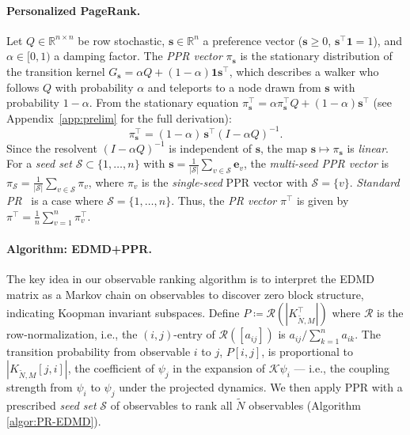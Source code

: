 \documentclass{article}
\theoremstyle{plain}
\theoremstyle{definition}
\def\R{\mathbb{R}}
\def\tp{\intercal}
\def\Koop{\mathcal{K}}
\newcommand{\arXivtag}[1][]{#1}
\begin{document}
	\paragraph{Personalized PageRank.}
	Let $Q \in \R^{n \times n}$ be row stochastic, $\mathbf{s} \in \R^n$ a preference vector ($\mathbf{s} \geq 0$, $\mathbf{s}^\tp\mathbf{1}=1$), and $\alpha \in [0,1)$ a damping factor. The \emph{PPR vector} ${\pi}_{\mathbf{s}}$ is the stationary distribution of the transition kernel $G_{\mathbf{s}} = \alpha Q + (1-\alpha)\mathbf{1}\mathbf{s}^\tp$, which describes a walker who follows $Q$ with probability $\alpha$ and teleports to a node drawn from $\mathbf{s}$ with probability $1-\alpha$. From the stationary equation ${\pi}_{\mathbf{s}}^\tp = \alpha{\pi}_{\mathbf{s}}^\tp Q + (1-\alpha)\mathbf{s}^\tp$ (see Appendix~\ref{app:prelim} for the full derivation):
	\begin{equation}\label{eq:ppr-resolvent}
		{\pi}_{\mathbf{s}}^\tp = (1-\alpha)\,\mathbf{s}^\tp(I - \alpha Q)^{-1}.
	\end{equation}
	Since the resolvent $(I - \alpha Q)^{-1}$ is independent of $\mathbf{s}$, the map $\mathbf{s} \mapsto {\pi}_{\mathbf{s}}$ is \emph{linear}. For a \emph{seed set} $\mathcal{S} \subset \{1,\ldots,n\}$ with $\mathbf{s} = \frac{1}{|\mathcal{S}|}\sum_{v \in \mathcal{S}}\mathbf{e}_v$, the \emph{multi-seed PPR vector} is $	{\pi}_{\mathcal{S}} = \frac{1}{|\mathcal{S}|}\sum_{v \in \mathcal{S}} {\pi}_v$, 
	where ${\pi}_v$ is the \emph{single-seed} PPR vector with $\mathcal{S} = \{v\}$. \emph{Standard PR}~\cite{PageRank1998, langville2004deeper} is a case where $\mathcal{S} = \{1,\ldots,n\}$. Thus, the \emph{PR vector} ${\pi}^\tp$ is given by ${\pi}^\tp = \frac{1}{n}\sum_{v=1}^n {\pi}_v^\tp$. 
	
	
	\paragraph{Algorithm: EDMD+PPR.}
	
	The key idea in our observable ranking algorithm is to interpret the EDMD matrix as a Markov chain on observables to discover zero block structure, indicating Koopman invariant subspaces. Define $P\coloneqq \mathcal{R}(|K_{\tilde{N},M}^\tp|)$ where $\mathcal{R}$ is the row-normalization, i.e., the $(i,j)$-entry of $\mathcal{R}([a_{ij}])$ is $a_{ij}/\sum_{k=1}^na_{ik}$. The transition probability from observable $i$ to $j$, $P[i,j]$, is proportional to $|K_{\tilde{N},M}[j,i]|$, the coefficient of $\psi_j$ in the expansion of $\Koop\psi_i$ --- i.e., the coupling strength from $\psi_i$ to $\psi_j$ under the projected dynamics. We then apply PPR with a prescribed \textit{seed set} $\mathcal{S}$ of observables to rank all $\tilde{N}$ observables \arXivtag[(Algorithm \ref{algor:PR-EDMD})]. 
	
\end{document}
